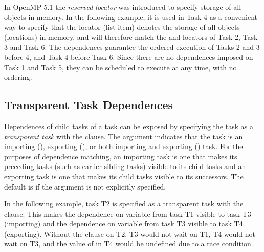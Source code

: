In OpenMP 5.1 the  \emph{reserved locator} was introduced
to specify storage of all objects in memory. In the following example,
it is used in Task 4 as a convenient way to specify that the locator
(list item) denotes the storage of all objects (locations) in memory, and 
will therefore match the  and  locators of Task 2, Task 3 and Task 6.
The dependences guarantee the ordered execution of Tasks 2 and 3 before 4, and
Task 4 before Task 6.
Since there are no dependences imposed on Task 1 and Task 5, they can be
scheduled to execute at any time, with no ordering.


\subsection{Transparent Task Dependences}
\label{subsec:depend_trans_task}

Dependences of child tasks of a task can be exposed by specifying 
the task as a \emph{transparent task} with the 
 clause.
The  argument indicates that the task is 
an importing (), exporting (),
or both importing and exporting () task.
For the purposes of dependence matching, an importing task is 
one that makes its preceding tasks (such as earlier
sibling tasks) visible to its child tasks and an exporting task
is one that makes its child tasks visible to its successors.
The default is  if the argument is not explicitly specified.

In the following example, task T2 is specified as a transparent task
with the  clause. This makes the dependence on
variable  from task T1 visible to task T3 (importing) and 
the dependence on variable  from task T3 visible to task T4
(exporting).  Without the  clause on T2, T3 would not
wait on T1, T4 would not wait on T3, and the value of  in T4 
would be undefined due to a race condition.


